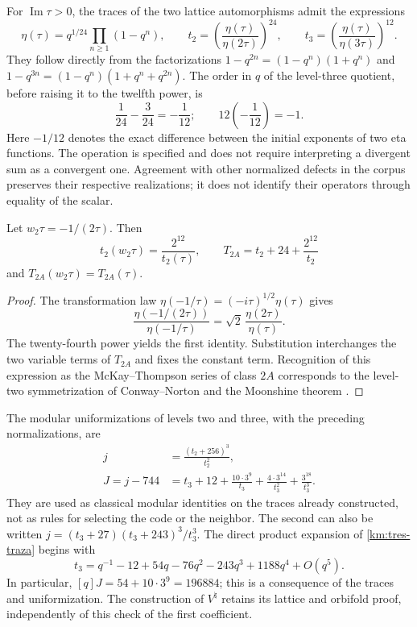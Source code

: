 For \(\operatorname{Im}\tau>0\), the traces of the two lattice
automorphisms admit the expressions
\begin{equation}
 \eta(\tau)=q^{1/24}\prod_{n\ge1}(1-q^n),\qquad
 t_2=\left(\frac{\eta(\tau)}{\eta(2\tau)}\right)^{24},\qquad
 t_3=\left(\frac{\eta(\tau)}{\eta(3\tau)}\right)^{12}.
 \label{km:eta-trazas}
\end{equation}
They follow directly from the factorizations
\(1-q^{2n}=(1-q^n)(1+q^n)\) and
\(1-q^{3n}=(1-q^n)(1+q^n+q^{2n})\). The order in \(q\) of the
level-three quotient, before raising it to the twelfth power, is
\[
 \frac1{24}-\frac3{24}=-\frac1{12};
 \qquad 12\left(-\frac1{12}\right)=-1.
\]
Here \(-1/12\) denotes the exact difference between the initial
exponents of two eta functions. The operation is specified and
does not require interpreting a divergent sum as a convergent one.
Agreement with other normalized defects in the corpus preserves
their respective realizations; it does not identify their operators
through equality of the scalar.

\begin{proposition}
\label{km:fricke-prop}
Let \(w_2\tau=-1/(2\tau)\). Then
\begin{equation}
 t_2(w_2\tau)=\frac{2^{12}}{t_2(\tau)},\qquad
 T_{2A}=t_2+24+\frac{2^{12}}{t_2}
 \label{km:fricke-t2}
\end{equation}
and \(T_{2A}(w_2\tau)=T_{2A}(\tau)\).
\end{proposition}
\begin{proof}
The transformation law
\(\eta(-1/\tau)=(-i\tau)^{1/2}\eta(\tau)\) gives
\[
 \frac{\eta(-1/(2\tau))}{\eta(-1/\tau)}
 =\sqrt2\,\frac{\eta(2\tau)}{\eta(\tau)}.
\]
The twenty-fourth power yields the first identity. Substitution
interchanges the two variable terms of \(T_{2A}\) and fixes
the constant term. Recognition of this expression as the
McKay--Thompson series of class \(2A\) corresponds to the
level-two symmetrization of Conway--Norton
\cite[\S\S4 and 6, Table~3]{kmconwaynorton1979} and the
Moonshine theorem \cite{borcherds}.
\end{proof}

The modular uniformizations of levels two and three, with the
preceding normalizations, are
\begin{align}
 j&=\frac{(t_2+256)^3}{t_2^2},
 \label{km:j-nivel2}\\
 J=j-744
 &=t_3+12+\frac{10\cdot3^9}{t_3}
       +\frac{4\cdot3^{14}}{t_3^2}
       +\frac{3^{18}}{t_3^3}.
 \label{km:j-nivel3}
\end{align}
They are used as classical modular identities on the traces already
constructed, not as rules for selecting the code or the neighbor.
The second can also be written
\(j=(t_3+27)(t_3+243)^3/t_3^3\).
The direct product expansion of \eqref{km:tres-traza} begins with
\[
 t_3=q^{-1}-12+54q-76q^2-243q^3+1188q^4+O(q^5).
\]
In particular, \([q]J=54+10\cdot3^9=196884\); this is a
consequence of the traces and uniformization. The construction of
\(V^\natural\) retains its lattice and orbifold proof,
independently of this check of the first coefficient.

